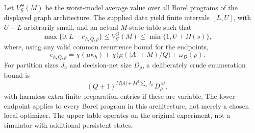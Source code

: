 \begin{theorem}\label{thm:compile}
Let $V_{\mathcal G}^\Theta(M)$ be the worst-model average value over all Borel programs of the displayed graph architecture. The supplied data yield finite intervals $[L,U]$, with $U-L$ arbitrarily small, and an actual $M$-state table such that
\begin{equation}\label{eq:certificate}
 \max\{0,L-e_{h,Q,\rho}\}\le V_{\mathcal G}^\Theta(M)
 \le\min\{1,U+\Omega(s)\},
\end{equation}
where, using any valid common recurrence bound for the endpoints,
\begin{equation}\label{eq:compileerror}
 e_{h,Q,\rho}=\chi(\bar\mu\kappa_h)
 +\chi\bigl(\bar\mu(|A|+M)/Q\bigr)+\omega_D(\rho).
\end{equation}
For partition sizes $J_a$ and decision-net size $D_\rho$, a deliberately crude enumeration bound is
\begin{equation}\label{eq:count}
 (Q+1)^{M|A|+M^2\sum_aJ_a}\,D_\rho^M,
\end{equation}
with harmless extra finite preparation entries if these are variable. The lower endpoint applies to every Borel program in this architecture, not merely a chosen local optimizer. The upper table operates on the original experiment, not a simulator with additional persistent states.
\end{theorem}

